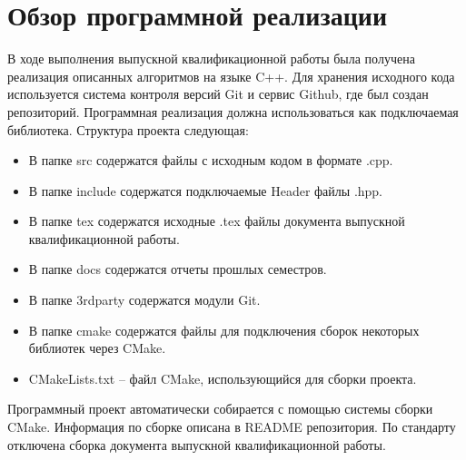 \newpage

\section{Обзор программной реализации}

В ходе выполнения выпускной квалификационной работы была получена реализация описанных алгоритмов на языке C++. Для хранения исходного кода используется система контроля версий Git и сервис Github, где был создан репозиторий. Программная реализация должна использоваться как подключаемая библиотека. Структура проекта следующая:
\begin{itemize}

\item В папке src содержатся файлы с исходным кодом в формате .cpp.

\item В папке include содержатся подключаемые Header файлы .hpp.

\item В папке tex содержатся исходные .tex файлы документа выпускной квалификационной работы.

\item В папке docs содержатся отчеты прошлых семестров.

\item В папке 3rdparty содержатся модули Git.

\item В папке cmake содержатся файлы для подключения сборок некоторых библиотек через CMake.

\item CMakeLists.txt -- файл CMake, использующийся для сборки проекта.

\end{itemize}

Программный проект автоматически собирается с помощью системы сборки CMake. Информация по сборке описана в README репозитория. По стандарту отключена сборка документа выпускной квалификационной работы.

\clearpage